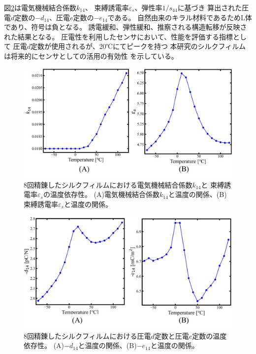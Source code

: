 \documentclass[dvipdfmx,12pt,a4paper]{jreport}
\begin{document}
			図\ref{8回_d定数_e定数_温度依存性}は電気機械結合係数$k_{14}$、
			束縛誘電率$\varepsilon_{s}$、弾性率$1/s_{44}$に基づき
			算出された圧電$d$定数の$-d_{14}$、圧電$e$定数の$-e_{14}$である。
			自然由来のキラル材料であるためL体であり、符号は負となる。
			誘電緩和、弾性緩和、推察される構造転移が反映された結果となる。
			圧電性を利用したセンサにおいて、性能を評価する指標として
			圧電$d$定数が使用されるが、20℃にてピークを持つ
			本研究のシルクフィルムは将来的にセンサとしての活用の有効性
			を示している。
			\begin{figure}[h]
				\centering
				\includegraphics[width=\linewidth]{8回_電気機械結合係数_誘電率.jpg}
				\caption{8回精錬したシルクフィルムにおける電気機械結合係数$k_{14}$と
				束縛誘電率$\varepsilon_s$の温度依存性。
				(A)電気機械結合係数$k_{14}$と温度の関係、(B)束縛誘電率$\varepsilon_s$と温度の関係。}
				\label{8回_電気機械結合係数_束縛誘電率_温度依存性}
			\end{figure}
			\newpage
			\begin{figure}[h]
				\centering
				\includegraphics[width=\linewidth]{8回_d定数_e定数_温度依存性.jpg}
				\caption{8回精錬したシルクフィルムにおける圧電$d$定数と圧電$e$定数の温度依存性。
				(A)$-d_{14}$と温度の関係、(B)$-e_{14}$と温度の関係。}
				\label{8回_d定数_e定数_温度依存性}
			\end{figure}
\end{document}
